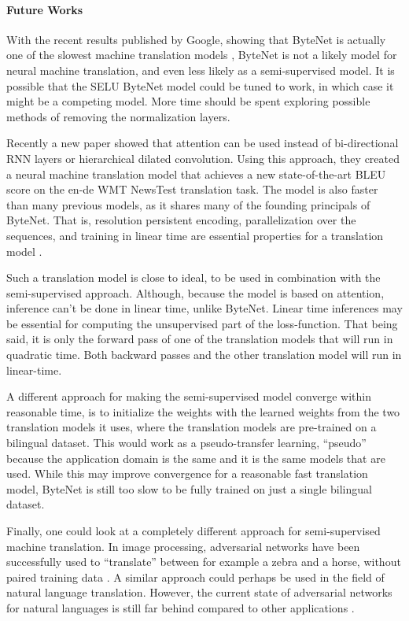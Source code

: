 
\paragraph{Future Works} With the recent results published by Google, showing that ByteNet is actually one of the slowest machine translation models \cite{tensor2tensor}, ByteNet is not a likely model for neural machine translation, and even less likely as a semi-supervised model. It is possible that the SELU ByteNet model could be tuned to work, in which case it might be a competing model. More time should be spent exploring possible methods of removing the normalization layers.

Recently a new paper showed that attention can be used instead of bi-directional RNN layers or hierarchical dilated convolution. Using this approach, they created a neural machine translation model that achieves a new state-of-the-art BLEU score on the en-de WMT NewsTest translation task. The model is also faster than many previous models, as it shares many of the founding principals of ByteNet. That is, resolution persistent encoding, parallelization over the sequences, and training in linear time are essential properties for a translation model \cite{attention-is-all-you-need}.

Such a translation model is close to ideal, to be used in combination with the semi-supervised approach. Although, because the model is based on attention, inference can't be done in linear time, unlike ByteNet. Linear time inferences may be essential for computing the unsupervised part of the loss-function. That being said, it is only the forward pass of one of the translation models that will run in quadratic time. Both backward passes and the other translation model will run in linear-time.

A different approach for making the semi-supervised model converge within reasonable time, is to initialize the weights with the learned weights from the two translation models it uses, where the translation models are pre-trained on a bilingual dataset. This would work as a pseudo-transfer learning, ``pseudo'' because the application domain is the same and it is the same models that are used. While this may improve convergence for a reasonable fast translation model, ByteNet is still too slow to be fully trained on just a single bilingual dataset.

Finally, one could look at a completely different approach for semi-supervised machine translation. In image processing, adversarial networks have been successfully used to ``translate'' between for example a zebra and a horse, without paired training data \cite{gan-image-translation}. A similar approach could perhaps be used in the field of natural language translation. However, the current state of adversarial networks for natural languages is still far behind compared to other applications \cite{gan-on-nlp}.